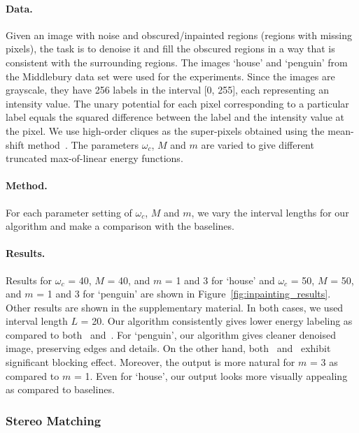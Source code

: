 \documentclass[runningheads]{llncs}
\newcommand{\mysubsubsection}[1]{\vspace{0mm}\subsubsection{#1} ~\\ \vspace{-2mm}}
\newcommand{\myparagraph}[1]{\vspace{-2mm}\paragraph{#1}}
\begin{document}
\myparagraph{\bf Data.} Given an image with noise and obscured/inpainted regions (regions with missing pixels), the task is to denoise it and fill the obscured regions in a way that is consistent with the surrounding regions. The images `house' and `penguin' from the Middlebury data set were used for the experiments. Since the images are grayscale, they have 256 labels in the interval [0, 255], each representing an intensity value. The unary potential for each pixel corresponding to a particular label equals the squared difference between the label and the intensity value at the pixel. We use high-order cliques as the super-pixels obtained using the mean-shift method~\cite{comaniciu2002mean}. The parameters $\omega_c$, $M$ and $m$ are varied to give different truncated max-of-linear energy functions.

\myparagraph{\bf Method.} For each parameter setting of $\omega_c$, $M$ and $m$, we vary the interval lengths for our algorithm and make a comparison with the baselines.

\myparagraph{\bf Results.} Results for $\omega_c$ = 40, $M$ = 40, and $m$ = 1 and 3 for `house' and $\omega_c$ = 50, $M$ = 50, and $m$ = 1 and 3 for `penguin' are shown in Figure~\ref{fig:inpainting_results}. Other results are shown in the supplementary material. In both cases, we used interval length $L$ = 20. Our algorithm consistently gives lower energy labeling as compared to both~\cite{dokaniaiccv15} and~\cite{ladickyeccv10}. For `penguin', our algorithm gives cleaner denoised image, preserving edges and details. On the other hand, both~\cite{dokaniaiccv15} and~\cite{ladickyeccv10} exhibit significant blocking effect. Moreover, the output is more natural for $m$ = 3 as compared to $m$ = 1. Even for `house', our output looks more visually appealing as compared to baselines.


\mysubsubsection{Stereo Matching}
\end{document}
